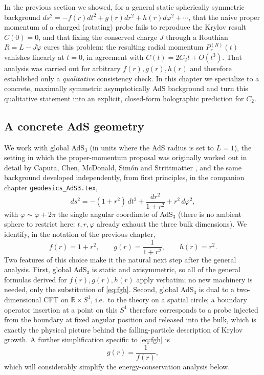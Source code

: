 \documentclass[11pt]{article}
\begin{document}
In the previous section we showed, for a general static spherically symmetric background $ds^2=-f(r)dt^2+g(r)dr^2+h(r)d\varphi^2+\cdots$, that the naive proper momentum of a charged (rotating) probe fails to reproduce the Krylov result $\dot C(0)=0$, and that fixing the conserved charge $J$ through a Routhian $R=L-J\dot\varphi$ cures this problem: the resulting radial momentum $P_r^{(R)}(t)$ vanishes linearly at $t=0$, in agreement with $\dot C(t)=2C_2t+O(t^3)$. That analysis was carried out for arbitrary $f(r),g(r),h(r)$ and therefore established only a \emph{qualitative} consistency check. In this chapter we specialize to a concrete, maximally symmetric asymptotically AdS background and turn this qualitative statement into an explicit, closed-form holographic prediction for $C_2$.

\subsection{A concrete AdS geometry}
\label{subsec:geometry}

We work with global AdS$_3$ (in units where the AdS radius is set to $L=1$), the setting in which the proper-momentum proposal was originally worked out in detail by Caputa, Chen, McDonald, Sim\'on and Strittmatter \cite{Caputa:2024odg}, and the same background developed independently, from first principles, in the companion chapter \texttt{geodesics\_AdS3.tex},
\begin{equation}
ds^2 = -(1+r^2)\,dt^2 + \frac{dr^2}{1+r^2} + r^2\,d\varphi^2 ,
\label{eq:globalAdS}
\end{equation}
with $\varphi\sim\varphi+2\pi$ the single angular coordinate of AdS$_3$ (there is no ambient sphere to restrict here: $t,r,\varphi$ already exhaust the three bulk dimensions). We identify, in the notation of the previous chapter,
\begin{equation}
f(r)=1+r^2, \qquad g(r)=\frac{1}{1+r^2}, \qquad h(r)=r^2 .
\label{eq:fgh}
\end{equation}
Two features of this choice make it the natural next step after the general analysis. First, global AdS$_3$ is static and axisymmetric, so all of the general formulas derived for $f(r),g(r),h(r)$ apply verbatim; no new machinery is needed, only the substitution of \eqref{eq:fgh}. Second, global AdS$_3$ is dual to a two-dimensional CFT on $\mathbb R\times S^1$, i.e.\ to the theory on a spatial circle; a boundary operator insertion at a point on this $S^1$ therefore corresponds to a probe injected from the boundary at fixed angular position and released into the bulk, which is exactly the physical picture behind the falling-particle description of Krylov growth. A further simplification specific to \eqref{eq:fgh} is
\begin{equation}
g(r) = \frac{1}{f(r)},
\label{eq:gequalsinvf}
\end{equation}
which will considerably simplify the energy-conservation analysis below.
\end{document}
